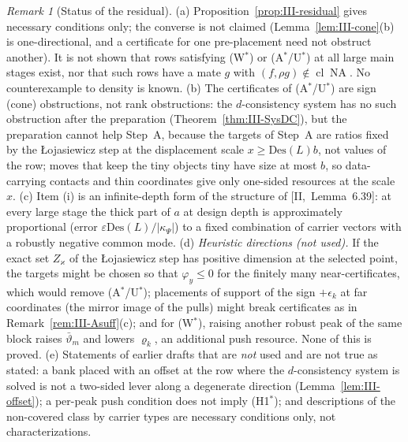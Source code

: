 \documentclass[10pt]{amsart}
\theoremstyle{definition}
\theoremstyle{remark}
\newtheorem{remark}[theorem]{Remark}
\newcommand{\NA}{\operatorname{NA}}
\newcommand{\cl}{\operatorname{cl}}
\begin{document}
\begin{remark}[Status of the residual]\label{rem:III-residual}
(a) Proposition~\ref{prop:III-residual} gives necessary conditions only; the
converse is not claimed (Lemma~\ref{lem:III-cone}(b) is one-directional, and a
certificate for one pre-placement need not obstruct another).  It is not shown
that rows satisfying (W$^*$) or (A$^*$/U$^*$) at all large main stages exist,
nor that such rows have a mate $g$ with $(f,\rho g)\notin\cl\NA$.  No
counterexample to density is known.
(b) The certificates of (A$^*$/U$^*$) are sign (cone) obstructions, not rank obstructions: the
$d$-consistency system has no such obstruction after the preparation
(Theorem~\ref{thm:III-SysDC}), but the preparation cannot help Step~A, because the
targets of Step~A are ratios fixed by the \L ojasiewicz step at the displacement
scale $x\ge\mathrm{Des}(L)b$, not values of the row; moves that keep the tiny
objects tiny have size at most $b$, so data-carrying contacts and thin
coordinates give only one-sided resources at the scale $x$.
(c) Item (i) is an infinite-depth form of the structure of
[II,~Lemma~6.39]: at every large stage the thick part of $a$ at design depth is
approximately proportional (error $\varepsilon\mathrm{Des}(L)/|\kappa_\Psi|$) to a fixed combination of carrier vectors with a robustly negative
common mode.
(d) \emph{Heuristic directions (not used).}  If the exact set $Z_\varkappa$ of
the \L ojasiewicz step has positive dimension at the selected point, the targets
might be chosen so that $\varphi_y\le0$ for the finitely many near-certificates,
which would remove (A$^*$/U$^*$); placements of support of the sign
$+\epsilon_k$ at far coordinates (the mirror image of the pulls) might break
certificates as in Remark~\ref{rem:III-Asuff}(c); and for (W$^*$), raising another
robust peak of the same block raises $\bar\vartheta_m$ and lowers $\varrho_k$,
an additional push resource.  None of this is proved.
(e) Statements of earlier drafts that are \emph{not} used and are not true as
stated: a bank placed with an offset at the row where the $d$-consistency system
is solved is not a two-sided lever along a degenerate direction
(Lemma~\ref{lem:III-offset}); a per-peak push condition does not imply (H1$^*$);
and descriptions of the non-covered class by carrier types are necessary
conditions only, not characterizations.
\end{remark}
\end{document}
